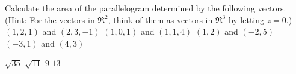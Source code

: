 
\begin{Exercise}[
name={},
title={}, 
difficulty=0,
origin={\cite{SM}}]
Calculate the area of the parallelogram determined by the following vectors. (Hint: For the vectors in $\Re^2$, think of them as vectors in $\Re^3$ by letting $z=0$.)
\Question $(1,2,1)$ and $(2,3,-1)$
\Question $(1,0,1)$ and $(1,1,4)$
\Question $(1,2)$ and $(-2,5)$
\Question $(-3,1)$ and $(4,3)$
\end{Exercise}

\begin{Answer}
\Question $\sqrt{35}$
\Question $\sqrt{11}$
\Question $9$
\Question $13$
\end{Answer}
